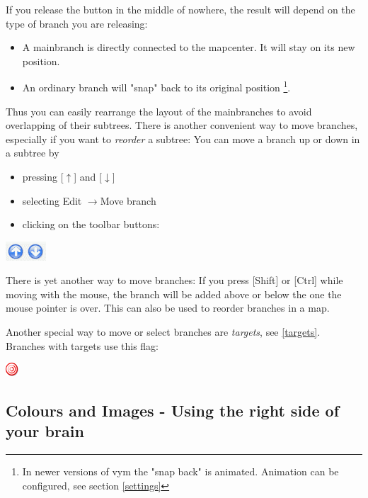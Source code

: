 \documentclass[12pt,a4paper]{article}
\newcommand{\ra}{$\longrightarrow$}
\newcommand{\ua}{$\uparrow$}
\newcommand{\da}{$\downarrow$}
\newcommand{\key}[1]{[#1]}
\begin{document}
If you release the button in the middle of nowhere, the result will
depend on the type of branch you are releasing:
\begin{itemize}
    \item A mainbranch is directly connected to the mapcenter.
        It will stay on its new position.
    \item An ordinary branch will "snap" back to its original position
    \footnote{In newer versions of vym the "snap back" is animated.
    Animation can be configured, see section \ref{settings}}. 
\end{itemize}
Thus you can easily rearrange the layout of the mainbranches to avoid
overlapping of their subtrees.  There is another convenient way to move
branches, especially if you want to {\em reorder} a subtree: You can
move a branch up or down in a subtree by
\begin{itemize}
    \item pressing \key{\ua} and \key {\da}
    \item selecting Edit \ra Move branch
    \item clicking on the toolbar buttons:
\end{itemize}
        \begin{center}
            \includegraphics[width=1.5cm]{images/move-buttons.png}
        \end{center}    
There is yet another way to move branches: If you press \key{Shift} or
\key{Ctrl} while moving with the mouse, the branch will be added above
or below the one the mouse pointer is over. This can also be used to
reorder branches in a map.

Another special way to move or select branches are {\em targets}, see
\ref{targets}. Branches with targets use this flag:
\begin{center}
    \includegraphics[width=0.5cm]{images/flag-target.png}
    \label{propwindow}
\end{center}


\subsection{Colours and Images - Using the right side of your brain}
\end{document}
